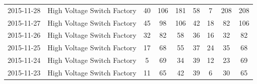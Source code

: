 \documentclass[a4paper,11pt]{article}
\begin{document}
\begin{appendices}
\begin{longtable}{ccccccccc}
    2015-11-28 & High Voltage Switch Factory & 40    & 106   & 181   & 58    & 7     & 208   & 208 \\
    2015-11-27 & High Voltage Switch Factory & 45    & 98    & 106   & 42    & 18    & 82    & 106 \\
    2015-11-26 & High Voltage Switch Factory & 32    & 82    & 58    & 36    & 16    & 32    & 82 \\
    2015-11-25 & High Voltage Switch Factory & 17    & 68    & 55    & 37    & 24    & 35    & 68 \\
    2015-11-24 & High Voltage Switch Factory & 5     & 69    & 34    & 39    & 12    & 23    & 69 \\
    2015-11-23 & High Voltage Switch Factory & 11    & 65    & 42    & 39    & 6     & 30    & 65 \\

\end{longtable}



\end{appendices}
\end{document}
